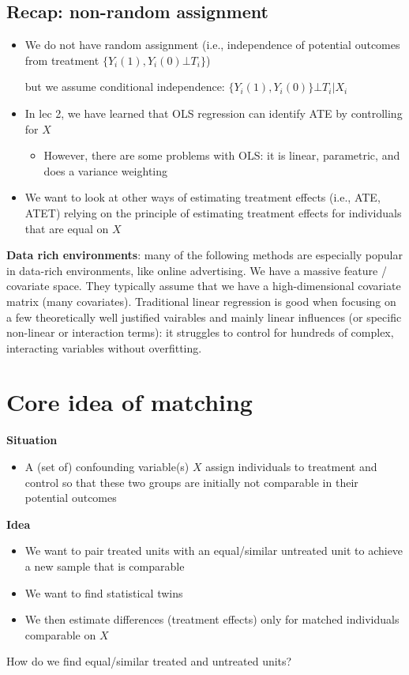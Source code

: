 \documentclass[10pt]{article}
\begin{document}
\subsection{Recap: non-random assignment}
\begin{itemize}
    \item We do not have random assignment (i.e., independence of potential outcomes from treatment $\{Y_i(1), Y_i(0) \bot T_i\}$)

    but we assume conditional independence: $\{Y_i(1), Y_i(0)\} \bot T_i|X_i$
    \item In lec 2, we have learned that OLS regression can identify ATE by controlling for $X $
    \begin{itemize}
        \item However, there are some problems with OLS: it is linear, parametric, and does a variance weighting
    \end{itemize}
    \item We want to look at other ways of estimating treatment effects (i.e., ATE, ATET) relying on the principle of estimating treatment effects for individuals that are equal on $X $
\end{itemize}
\textbf{Data rich environments}: many of the following methods are especially popular in data-rich environments, like online advertising. We have a massive feature / covariate space. They typically assume that we have a high-dimensional covariate matrix (many covariates). Traditional linear regression is good when focusing on a few theoretically well justified vairables and mainly linear influences (or specific non-linear or interaction terms): it struggles to control for hundreds of complex, interacting variables without overfitting. 
\newpage 
\section{Core idea of matching}
\textbf{Situation}
\begin{itemize}
    \item A (set of) confounding variable(s) $X $ assign individuals to treatment and control so that these two groups are initially not comparable in their potential outcomes 
\end{itemize}
\textbf{Idea}
\begin{itemize}
    \item We want to pair treated units with an equal/similar untreated unit to achieve a new sample that is comparable
    \item We want to find statistical twins 
    \item We then estimate differences (treatment effects) only for matched individuals comparable on $X $
\end{itemize}
How do we find equal/similar treated and untreated units?
\end{document}
